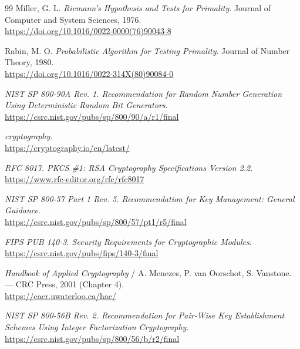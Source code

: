 \documentclass[12pt,a4paper]{article}
\begin{document}
\begin{thebibliography}{99}
    Miller, G. L.
    \textit{Riemann's Hypothesis and Tests for Primality}.
    Journal of Computer and System Sciences, 1976.
    \\
    \url{https://doi.org/10.1016/0022-0000(76)90043-8}

    Rabin, M. O.
    \textit{Probabilistic Algorithm for Testing Primality}.
    Journal of Number Theory, 1980.
    \\
    \url{https://doi.org/10.1016/0022-314X(80)90084-0}

    \textit{NIST SP 800-90A Rev. 1. Recommendation for Random Number Generation Using Deterministic Random Bit Generators}.
    \\
    \url{https://csrc.nist.gov/pubs/sp/800/90/a/r1/final}

    \textit{cryptography}.
    \\
    \url{https://cryptography.io/en/latest/}

    \textit{RFC 8017. PKCS \#1: RSA Cryptography Specifications Version 2.2}.
    \\
    \url{https://www.rfc-editor.org/rfc/rfc8017}

    \textit{NIST SP 800-57 Part 1 Rev. 5. Recommendation for Key Management: General Guidance}.
    \\
    \url{https://csrc.nist.gov/pubs/sp/800/57/pt1/r5/final}

    \textit{FIPS PUB 140-3. Security Requirements for Cryptographic Modules}.
    \\
    \url{https://csrc.nist.gov/pubs/fips/140-3/final}

    \textit{Handbook of Applied Cryptography} / A. Menezes, P. van Oorschot, S. Vanstone. --- CRC Press, 2001 (Chapter 4).
    \\
    \url{https://cacr.uwaterloo.ca/hac/}

    \textit{NIST SP 800-56B Rev. 2. Recommendation for Pair-Wise Key Establishment Schemes Using Integer Factorization Cryptography}.
    \\
    \url{https://csrc.nist.gov/pubs/sp/800/56/b/r2/final}

\end{thebibliography}
\end{document}
